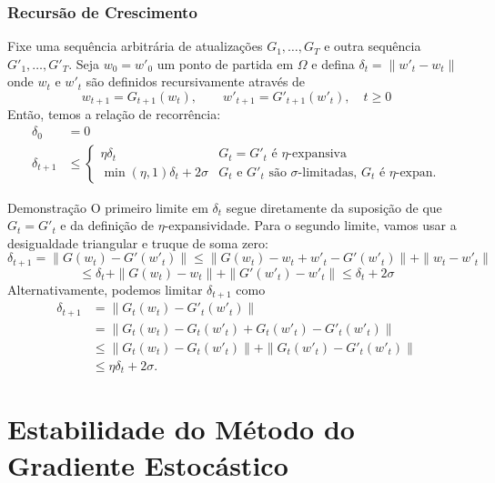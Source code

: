 \documentclass{beamer}
\begin{document}
\begin{frame}
\frametitle{Recursão de Crescimento}
\begin{lemma}[2.5] Fixe uma sequência arbitrária de atualizações \(G_{1},\ldots,G_{T}\) e outra sequência \(G'_{1},\ldots,G'_{T}\). Seja \(w_{0}=w'_{0}\) um ponto de partida em \(\Omega\) e defina \(\delta_{t}=\|w'_{t}-w_{t}\|\) onde \(w_{t}\) e \(w'_{t}\) são definidos recursivamente através de 
\[w_{t+1}=G_{t+1}(w_{t}), \qquad  w'_{t+1}=G'_{t+1}(w'_{t}), \quad t\ge0\]
Então, temos a relação de recorrência: 
\small
\begin{align*}
     \delta_{0}&=0 \\
     \delta_{t+1} &\le \begin{cases} \eta\delta_{t} & G_{t}=G'_{t} \text{ é } \eta\text{-expansiva} \\ \min(\eta,1)\delta_{t}+2\sigma & G_{t} \text{ e } G'_{t} \text{ são } \sigma\text{-limitadas, } G_{t} \text{ é } \eta\text{-expan.} \end{cases}
\end{align*} 
\end{lemma}
\end{frame}

\begin{frame}{Demonstração}
O primeiro limite em \(\delta_{t}\) segue diretamente da suposição de que \(G_{t}=G'_{t}\) e da definição de $\eta$-expansividade.  
Para o segundo limite, vamos usar a desigualdade triangular e truque de soma zero:
{\small
$$ \delta_{t+1} = \|G(w_{t}) - G'(w'_{t})\| \le \|G(w_{t})-w_{t}+w'_{t}-G'(w'_{t})\| + \|w_{t}-w'_{t}\| $$
$$ \le \delta_{t} + \|G(w_{t})-w_{t}\| + \|G'(w'_{t})-w'_{t}\| \le \delta_{t} + 2\sigma $$
}
Alternativamente, podemos limitar \(\delta_{t+1}\) como
\small
\begin{align*}
\delta_{t+1} &= \|G_{t}(w_{t})-G'_{t}(w'_{t})\| \\
&= \|G_{t}(w_{t})-G_{t}(w'_{t})+G_{t}(w'_{t})-G'_{t}(w'_{t})\| \\
&\le \|G_{t}(w_{t})-G_{t}(w'_{t})\| + \|G_{t}(w'_{t})-G'_{t}(w'_{t})\| \\
&\le \eta\delta_{t} + 2\sigma.
\end{align*} 
\end{frame}

\section{Estabilidade do Método do Gradiente Estocástico}
\begin{frame}
\tableofcontents[currentsection]
\end{frame}
\end{document}
